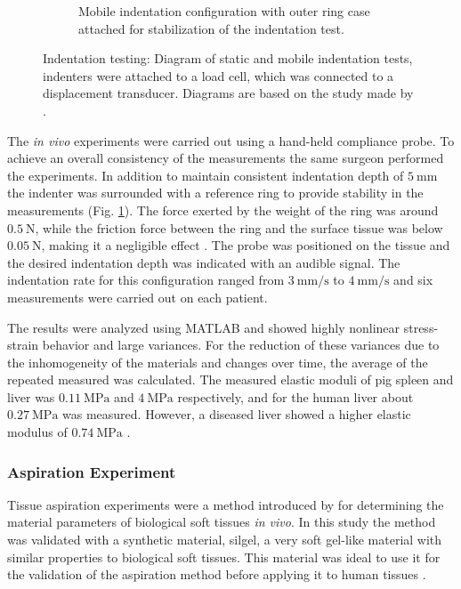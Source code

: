 \begin{figure}
\begin{subfigure}[b]{0.45\textwidth}
        \caption{Mobile indentation configuration with outer ring case attached for stabilization of the indentation test.}
        \label{fig:carter2}
        \end{subfigure}
        \hspace{0.3cm}
        \caption[Indentation setup of synthetic and biological tissues]{Indentation testing: Diagram of static and mobile indentation tests, indenters were attached to a load cell, which was connected to a displacement transducer. Diagrams are based on the study made by \citet{Carter2001}.}
        \label{fig:indentationcarter}
\end{figure}

The \textit{in vivo} experiments were carried out using a hand-held compliance probe. To achieve 
an overall consistency of the measurements the same surgeon performed the experiments. 
In addition to maintain consistent indentation depth of $\SI{5}{\milli \m}$ the indenter was 
surrounded with a reference ring to provide stability in the measurements (Fig. \ref{fig:carter2}). The force 
exerted by the weight of the ring was around $\SI{0.5}{\newton}$, while the friction force 
between the ring and the surface tissue was below $\SI{0.05}{\newton}$, making it a negligible 
effect \cite{Carter2001}. The probe was positioned on the tissue and the desired indentation depth was 
indicated with an audible signal. The indentation rate for this configuration ranged 
from $\SI[per-mode = symbol]{3}{\milli \m\per \second}$ to $\SI[per-mode = symbol]{4}{\milli \m\per \second}$ and 
six measurements were carried out on each patient.

The results were analyzed using MATLAB and showed highly nonlinear stress-strain behavior and large variances. 
For the reduction of these variances due to the inhomogeneity of the materials and changes over time, 
the average of the repeated measured was calculated. The measured elastic moduli of pig 
spleen and liver was $\SI{0.11}{\mega \pascal}$ and $\SI{4}{\mega \pascal}$ respectively, and 
for the human liver about $\SI{0.27}{\mega \pascal}$ was measured. However, a 
diseased liver showed a higher elastic modulus of $\SI{0.74}{\mega \pascal}$ \cite{Carter2001}.
\subsubsection*{Aspiration Experiment}

Tissue aspiration experiments were a method introduced by \citet{Kauer2002} for determining 
the material parameters of biological soft tissues \textit{in vivo}.
In this study the method was validated with a synthetic material, silgel, a very 
soft gel-like material with similar properties to biological soft tissues. 
This material was ideal to use it for the validation of the 
aspiration method before applying it to human tissues \cite{Kauer2002}.

